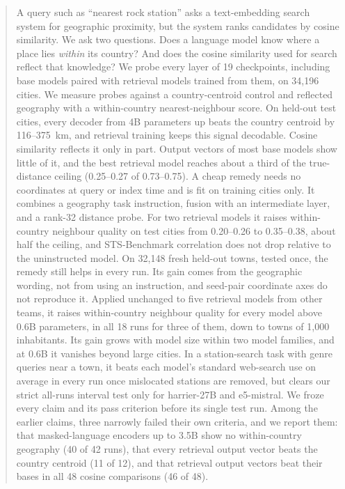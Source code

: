 \begin{abstract}
A query such as ``nearest rock station'' asks a text-embedding search system for geographic proximity, but the system ranks candidates by cosine similarity. We ask two questions. Does a language model know where a place lies \emph{within} its country? And does the cosine similarity used for search reflect that knowledge? We probe every layer of 19 checkpoints, including base models paired with retrieval models trained from them, on 34,196 cities. We measure probes against a country-centroid control and reflected geography with a within-country nearest-neighbour score. On held-out test cities, every decoder from 4B parameters up beats the country centroid by 116--375~km, and retrieval training keeps this signal decodable. Cosine similarity reflects it only in part. Output vectors of most base models show little of it, and the best retrieval model reaches about a third of the true-distance ceiling (0.25--0.27 of 0.73--0.75). A cheap remedy needs no coordinates at query or index time and is fit on training cities only. It combines a geography task instruction, fusion with an intermediate layer, and a rank-32 distance probe. For two retrieval models it raises within-country neighbour quality on test cities from 0.20--0.26 to 0.35--0.38, about half the ceiling, and STS-Benchmark correlation does not drop relative to the uninstructed model. On 32,148 fresh held-out towns, tested once, the remedy still helps in every run. Its gain comes from the geographic wording, not from using an instruction, and seed-pair coordinate axes do not reproduce it. Applied unchanged to five retrieval models from other teams, it raises within-country neighbour quality for every model above 0.6B parameters, in all 18 runs for three of them, down to towns of 1,000 inhabitants. Its gain grows with model size within two model families, and at 0.6B it vanishes beyond large cities. In a station-search task with genre queries near a town, it beats each model's standard web-search use on average in every run once mislocated stations are removed, but clears our strict all-runs interval test only for harrier-27B and e5-mistral. We froze every claim and its pass criterion before its single test run. Among the earlier claims, three narrowly failed their own criteria, and we report them: that masked-language encoders up to 3.5B show no within-country geography (40 of 42 runs), that every retrieval output vector beats the country centroid (11 of 12), and that retrieval output vectors beat their bases in all 48 cosine comparisons (46 of 48).
\end{abstract}
